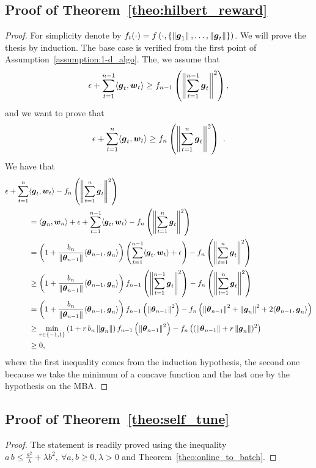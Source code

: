 \subsection{Proof of Theorem~\ref{theo:hilbert_reward}}
\begin{proof}
  For simplicity denote by $f_t(\cdot)=f\left(\cdot, \{\left\|{\boldsymbol{g}_1}\right\|, \ldots, \left\|{\boldsymbol{g}_t}\right\|\}\right)$.
  We will prove the thesis by induction. The base case is verified from the first point of Assumption~\ref{assumption:1-d_algo}. The, we assume that 
  \[
  \epsilon + \sum_{t=1}^{n-1} \langle \boldsymbol{g}_t, \boldsymbol{w}_t \rangle \geq f_{n-1}\left( \left\|{\sum_{t=1}^{n-1} \boldsymbol{g}_t}\right\|^2\right),
  \]
  and we want to prove that 
  \[
  \epsilon + \sum_{t=1}^{n} \langle \boldsymbol{g}_t, \boldsymbol{w}_t \rangle \geq f_{n}\left( \left\|{\sum_{t=1}^{n} \boldsymbol{g}_t}\right\|^2\right)~.
  \]
  We have that
  \begin{align*}
  \epsilon + \sum_{t=1}^{n} &\langle \boldsymbol{g}_t, \boldsymbol{w}_t \rangle - f_n\left( \left\|{\sum_{t=1}^{n} \boldsymbol{g}_t}\right\|^2\right) \\
  &= \langle \boldsymbol{g}_n, \boldsymbol{w}_n \rangle + \epsilon + \sum_{t=1}^{n-1} \langle \boldsymbol{g}_t, \boldsymbol{w}_t \rangle - f_n\left( \left\|{\sum_{t=1}^{n} \boldsymbol{g}_t}\right\|^2\right)\\
  &= \left(1+\frac{b_n}{\left\|{{\boldsymbol{\theta}}_{n-1}}\right\|}\langle {\boldsymbol{\theta}}_{n-1},\boldsymbol{g}_n \rangle \right)\left(\sum_{t=1}^{n-1} \langle \boldsymbol{g}_t, \boldsymbol{w}_t \rangle +\epsilon \right) - f_n\left( \left\|{\sum_{t=1}^{n} \boldsymbol{g}_t}\right\|^2\right)\\
  &\geq \left(1+\frac{b_n}{\left\|{{\boldsymbol{\theta}}_{n-1}}\right\|}\langle {\boldsymbol{\theta}}_{n-1},\boldsymbol{g}_n \rangle \right) f_{n-1}\left( \left\|{\sum_{t=1}^{n-1} \boldsymbol{g}_t}\right\|^2\right) - f_n\left( \left\|{\sum_{t=1}^{n} \boldsymbol{g}_t}\right\|^2\right)\\
  &= \left(1+\frac{b_n}{\left\|{{\boldsymbol{\theta}}_{n-1}}\right\|}\langle {\boldsymbol{\theta}}_{n-1},\boldsymbol{g}_n \rangle \right) f_{n-1}\left( \left\|{{\boldsymbol{\theta}}_{n-1}}\right\|^2\right) - f_n\left( \left\|{{\boldsymbol{\theta}}_{n-1}}\right\|^2 + \left\|{\boldsymbol{g}_n}\right\|^2 + 2 \langle {\boldsymbol{\theta}}_{n-1}, \boldsymbol{g}_n \rangle \right)\\
  &\geq \min_{r\in \{-1,1\}} \left(1+ r\, b_n \left\|{\boldsymbol{g}_n}\right\| \right) f_{n-1}\left( \left\|{{\boldsymbol{\theta}}_{n-1}}\right\|^2\right) - f_n\left(( \left\|{{\boldsymbol{\theta}}_{n-1}}\right\| + r \left\|{\boldsymbol{g}_n}\right\|)^2\right)\\
  &\geq 0,
  \end{align*}
  where the first inequality comes from the induction hypothesis, the second one because we take the minimum of a concave function and the last one by the hypothesis on the \ac{MBA}.
\end{proof}


\subsection{Proof of Theorem~\ref{theo:self_tune}}
\begin{proof}
The statement is readily proved using the inequality $a\,b \leq \frac{a^2}{\lambda} + \lambda b^2, \ \forall a,b\geq0, \lambda>0$ and Theorem~\ref{theo:online_to_batch}.
\end{proof}

